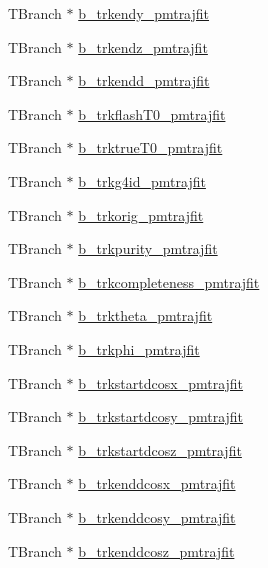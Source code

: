 \begin{DoxyCompactItemize}
T\-Branch $\ast$ \hyperlink{classanatree_ae76fbb3bfac489e9d02d31831377a0fd}{b\-\_\-trkendy\-\_\-pmtrajfit}
\item 
T\-Branch $\ast$ \hyperlink{classanatree_a70c298597cd7028c8d0d617f894fe629}{b\-\_\-trkendz\-\_\-pmtrajfit}
\item 
T\-Branch $\ast$ \hyperlink{classanatree_a55c856debe271a019ac7c6cf2036a42e}{b\-\_\-trkendd\-\_\-pmtrajfit}
\item 
T\-Branch $\ast$ \hyperlink{classanatree_a613adda2d0c0ae583c999a99b5cd87b6}{b\-\_\-trkflash\-T0\-\_\-pmtrajfit}
\item 
T\-Branch $\ast$ \hyperlink{classanatree_ac446afc6deb73abd9dab37ad73f1fa8c}{b\-\_\-trktrue\-T0\-\_\-pmtrajfit}
\item 
T\-Branch $\ast$ \hyperlink{classanatree_acb87e1d23628ce8a738a2ac478782bac}{b\-\_\-trkg4id\-\_\-pmtrajfit}
\item 
T\-Branch $\ast$ \hyperlink{classanatree_abc1dbea56a02d085bc8c1e2784937c6f}{b\-\_\-trkorig\-\_\-pmtrajfit}
\item 
T\-Branch $\ast$ \hyperlink{classanatree_aeca569e3323d1f0a200c82db4302301a}{b\-\_\-trkpurity\-\_\-pmtrajfit}
\item 
T\-Branch $\ast$ \hyperlink{classanatree_a25104c0078466f5d0de3ffe611f2416a}{b\-\_\-trkcompleteness\-\_\-pmtrajfit}
\item 
T\-Branch $\ast$ \hyperlink{classanatree_a192cb54dc7330981fa9cc9b92e233128}{b\-\_\-trktheta\-\_\-pmtrajfit}
\item 
T\-Branch $\ast$ \hyperlink{classanatree_a9c644532570ac09958ca3a0cf821c8cd}{b\-\_\-trkphi\-\_\-pmtrajfit}
\item 
T\-Branch $\ast$ \hyperlink{classanatree_a1b8b0f1cf447561daa2a3ac193da94a0}{b\-\_\-trkstartdcosx\-\_\-pmtrajfit}
\item 
T\-Branch $\ast$ \hyperlink{classanatree_ac9fe5997b2e476a2016fed21dcabeffb}{b\-\_\-trkstartdcosy\-\_\-pmtrajfit}
\item 
T\-Branch $\ast$ \hyperlink{classanatree_afb0a74879ede6cfb80bd480cd30ffed9}{b\-\_\-trkstartdcosz\-\_\-pmtrajfit}
\item 
T\-Branch $\ast$ \hyperlink{classanatree_a3c909f9535c74f83264e80782bdf84e2}{b\-\_\-trkenddcosx\-\_\-pmtrajfit}
\item 
T\-Branch $\ast$ \hyperlink{classanatree_ae584bec2ef0b97997b87dfee09a1378e}{b\-\_\-trkenddcosy\-\_\-pmtrajfit}
\item 
T\-Branch $\ast$ \hyperlink{classanatree_a071b975050b22ffc9dff743cd188c36b}{b\-\_\-trkenddcosz\-\_\-pmtrajfit}

\end{DoxyCompactItemize}
